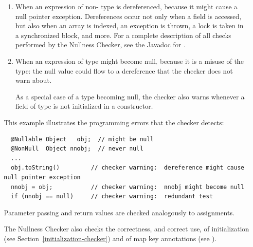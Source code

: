 \begin{enumerate}

\item
  When an expression of non- type
  is dereferenced, because it might cause a null pointer exception.
  Dereferences occur not only when a field is accessed, but also when an array
  is indexed, an exception is thrown, a lock is taken in a synchronized
  block, and more.  For a complete description of all checks performed by
  the Nullness Checker, see the Javadoc for
  .

\item
  When an expression of  type
  might become null, because it
  is a misuse of the type:  the null value could flow to a dereference that
  the checker does not warn about.

  As a special case of a 
  type becoming null, the checker also warns whenever a field of
   type is not initialized in a
  constructor.

\end{enumerate}

This example illustrates the programming errors that the checker detects:

\begin{Verbatim}
  @Nullable Object   obj;  // might be null
  @NonNull  Object nnobj;  // never null
  ...
  obj.toString()         // checker warning:  dereference might cause null pointer exception
  nnobj = obj;           // checker warning:  nnobj might become null
  if (nnobj == null)     // checker warning:  redundant test
\end{Verbatim}

Parameter passing and return values are checked analogously to assignments.

\iffalse %
The Nullness Checker also checks the correctness, and correct use, of
initialization (see
Section~\ref{initialization-checker}), of map key annotations (see
\chapterpageref{map-key-checker}), and of path shape annotations (see
\chapterpageref{path-shape-checker}).
\else
The Nullness Checker also checks the correctness, and correct use, of
initialization (see
Section~\ref{initialization-checker}) and of map key annotations (see
).
\fi


